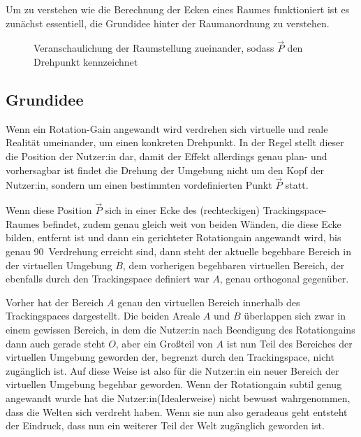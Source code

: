 Um zu verstehen wie die Berechnung der Ecken eines Raumes funktioniert ist es zunächst essentiell, die Grundidee hinter der Raumanordnung zu verstehen.

\begin{figure}[H]
    \caption{Veranschaulichung der Raumstellung zueinander, sodass $\vec{P}$ den Drehpunkt kennzeichnet }\label{figure:two_rooms} %
\end{figure}

\subsection{Grundidee}
\label{subsec:roomplaceidea}
Wenn ein Rotation-Gain angewandt wird verdrehen sich virtuelle und reale Realität umeinander, um einen konkreten Drehpunkt. In der Regel stellt dieser die Position der Nutzer:in dar, damit der Effekt allerdings genau plan- und vorhersagbar ist findet die Drehung der Umgebung nicht um den Kopf der Nutzer:in, sondern um einen bestimmten vordefinierten Punkt $\vec{P}$ statt.

Wenn diese Position $\vec{P}$ sich in einer Ecke des (rechteckigen) Trackingspace-Raumes befindet, zudem genau gleich weit von beiden Wänden, die diese Ecke bilden, entfernt ist und dann ein gerichteter Rotationgain angewandt wird,
bis genau 90\textdegree\ Verdrehung erreicht sind, dann steht der aktuelle begehbare Bereich in der virtuellen Umgebung $B$, dem vorherigen begehbaren virtuellen Bereich, der ebenfalls durch den Trackingspace definiert war $A$, genau orthogonal gegenüber.

Vorher hat der Bereich $A$ genau den virtuellen Bereich innerhalb des Trackingspaces dargestellt. Die beiden Areale $A$ und $B$ überlappen sich zwar in einem gewissen Bereich, in dem die Nutzer:in nach Beendigung des Rotationgains dann auch gerade steht $O$, aber ein Großteil von $A$ ist nun Teil des Bereiches der virtuellen Umgebung geworden der, begrenzt durch den Trackingspace, nicht zugänglich ist. Auf diese Weise ist also für die Nutzer:in ein neuer Bereich der virtuellen Umgebung begehbar geworden.
Wenn der Rotationgain subtil genug angewandt wurde hat die Nutzer:in(Idealerweise) nicht bewusst wahrgenommen, dass die Welten sich verdreht haben. Wenn sie nun also geradeaus geht entsteht der Eindruck, dass nun ein weiterer Teil der Welt zugänglich geworden ist.


